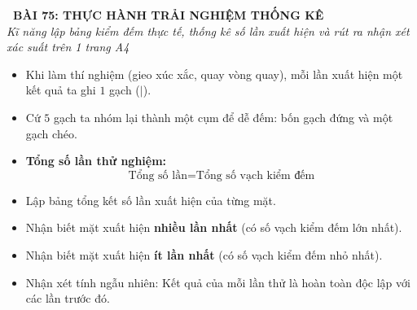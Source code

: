 \documentclass[11pt,a4paper]{article}
\begin{document}
\begin{tcolorbox}[
  enhanced,
  colback=white,
  colframe=primary,
  arc=3mm,
  boxrule=1.2pt,
  left=4mm, right=4mm, top=2.5mm, bottom=2.5mm,
  drop shadow=black!10!white
]
  \centering
  {\Large\bfseries\color{primary}\faBookmark\ BÀI 75: THỰC HÀNH TRẢI NGHIỆM THỐNG KÊ}\\[1.5mm]
  {\small\itshape\color{black!75}Kĩ năng lập bảng kiểm đếm thực tế, thống kê số lần xuất hiện và rút ra nhận xét xác suất trên 1 trang A4}
\end{tcolorbox}

\vspace{-2mm}


\noindent
\begin{minipage}[t]{0.49\textwidth}\vspace{0pt}
\begin{tcolorbox}[
  enhanced,
  colback=blue!4!white,
  colframe=blue!75!black,
  arc=2mm, boxrule=0.8pt,
  left=2mm, right=2mm, top=1.8mm, bottom=1.8mm,
  title={\footnotesize\bfseries\color{white}\faKey\ 1. Kĩ thuật kiểm đếm bằng vạch}
]
{\footnotesize
\begin{itemize}\setlength{\itemsep}{1.5pt}\setlength{\leftskip}{-2.5mm}
  \item Khi làm thí nghiệm (gieo xúc xắc, quay vòng quay), mỗi lần xuất hiện một kết quả ta ghi $1$ gạch ($|$).
  \item Cứ $5$ gạch ta nhóm lại thành một cụm để dễ đếm: bốn gạch đứng và một gạch chéo.
  \item \textbf{Tổng số lần thử nghiệm:}
  $$\text{Tổng số lần} = \text{Tổng số vạch kiểm đếm}$$
  \item Lập bảng tổng kết số lần xuất hiện của từng mặt.
\end{itemize}
}
\end{tcolorbox}
\end{minipage}
\hfill
\begin{minipage}[t]{0.49\textwidth}\vspace{0pt}
\begin{tcolorbox}[
  enhanced,
  colback=teal!4!white,
  colframe=teal!75!black,
  arc=2mm, boxrule=0.8pt,
  left=2mm, right=2mm, top=1.8mm, bottom=1.8mm,
  title={\footnotesize\bfseries\color{white}\faSliders\ 2. Đọc và nhận xét kết quả}
]
{\footnotesize
\begin{itemize}\setlength{\itemsep}{1.5pt}\setlength{\leftskip}{-2.5mm}
  \item Nhận biết mặt xuất hiện \textbf{nhiều lần nhất} (có số vạch kiểm đếm lớn nhất).
  \item Nhận biết mặt xuất hiện \textbf{ít lần nhất} (có số vạch kiểm đếm nhỏ nhất).
  \item Nhận xét tính ngẫu nhiên: Kết quả của mỗi lần thử là hoàn toàn độc lập với các lần trước đó.
\end{itemize}
}
\end{tcolorbox}
\end{minipage}
\end{document}
